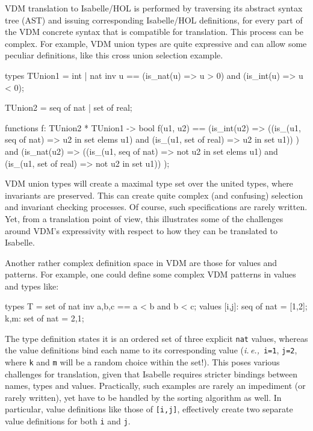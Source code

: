 \documentclass[runningheads,a4paper]{llncs}
\newcommand{\ie}{{\em i.\,e.,\/}}
\begin{document}
VDM translation to Isabelle/HOL is performed by traversing its abstract syntax tree (AST) and issuing corresponding Isabelle/HOL definitions, for every part of the VDM concrete syntax that is compatible for translation. This process can be complex. For example, VDM union types are quite expressive and can allow some peculiar definitions, like this cross union selection example.
%
\begin{vdmsl}[frame=none,basicstyle=\ttfamily\scriptsize]
    types
        TUnion1 = int | nat
        inv u == (is_nat(u) => u > 0) and (is_int(u) => u < 0);

        TUnion2 = seq of nat | set of real;

    functions 
        f: TUnion2 * TUnion1 -> bool
        f(u1, u2) ==
            (is_int(u2) => 
                ((is_(u1, seq of nat) => u2 in set elems u1)
                  and
                 (is_(u1, set of real) => u2 in set u1))
            )
            and
            (is_nat(u2) => 
                ((is_(u1, seq of nat) => not u2 in set elems u1)
                  and
                 (is_(u1, set of real) => not u2 in set u1))
            );
\end{vdmsl}
%
VDM union types will create a maximal type set over the united types, where invariants are preserved. This can create quite complex (and confusing) selection and invariant checking processes. Of course, such specifications are rarely written. Yet, from a translation point of view, this illustrates some of the challenges around VDM's expressivity with respect to how they can be translated to Isabelle. 

Another rather complex definition space in VDM are those for values and patterns. For example, one could define some complex VDM patterns in values and types like:
%
\begin{vdmsl}[frame=none,basicstyle=\ttfamily\scriptsize]
    types
        T = set of nat inv {a,b,c} == a < b and b < c;
    values 
        [i,j]: seq of nat = [1,2];
        {k,m}: set of nat = {2,1};
\end{vdmsl}
%
The type definition states it is an ordered set of three explicit \verb'nat' values, whereas the value definitions bind each name to its corresponding value (\ie~\verb'i=1', \verb'j=2', where \verb'k' and \verb'm' will be a random choice within the set!). This poses various challenges for translation, given that Isabelle requires stricter bindings between names, types and values. Practically, such examples are rarely an impediment (or rarely written), yet have to be handled by the sorting algorithm as well. In particular, value definitions like those of \verb'[i,j]', effectively create two separate value definitions for both \verb'i' and \verb'j'.   
\end{document}
